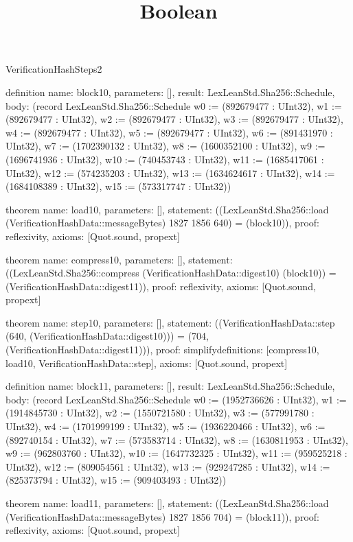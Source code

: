 \begin{lexlean}{VerificationHashSteps2}
\title{Boolean}
\begin{semanticmodule}

definition{
  name: block10,
  parameters: [],
  result: LexLeanStd.Sha256::Schedule,
  body: (record LexLeanStd.Sha256::Schedule {w0 := (892679477 : UInt32), w1 := (892679477 : UInt32), w2 := (892679477 : UInt32), w3 := (892679477 : UInt32), w4 := (892679477 : UInt32), w5 := (892679477 : UInt32), w6 := (891431970 : UInt32), w7 := (1702390132 : UInt32), w8 := (1600352100 : UInt32), w9 := (1696741936 : UInt32), w10 := (740453743 : UInt32), w11 := (1685417061 : UInt32), w12 := (574235203 : UInt32), w13 := (1634624617 : UInt32), w14 := (1684108389 : UInt32), w15 := (573317747 : UInt32)})
}

theorem{
  name: load10,
  parameters: [],
  statement: ((LexLeanStd.Sha256::load (VerificationHashData::messageBytes) 1827 1856 640) = (block10)),
  proof: reflexivity{},
  axioms: [Quot.sound, propext]
}

theorem{
  name: compress10,
  parameters: [],
  statement: ((LexLeanStd.Sha256::compress (VerificationHashData::digest10) (block10)) = (VerificationHashData::digest11)),
  proof: reflexivity{},
  axioms: [Quot.sound, propext]
}

theorem{
  name: step10,
  parameters: [],
  statement: ((VerificationHashData::step (640, (VerificationHashData::digest10))) = (704, (VerificationHashData::digest11))),
  proof: simplify{definitions: [compress10, load10, VerificationHashData::step]},
  axioms: [Quot.sound, propext]
}

definition{
  name: block11,
  parameters: [],
  result: LexLeanStd.Sha256::Schedule,
  body: (record LexLeanStd.Sha256::Schedule {w0 := (1952736626 : UInt32), w1 := (1914845730 : UInt32), w2 := (1550721580 : UInt32), w3 := (577991780 : UInt32), w4 := (1701999199 : UInt32), w5 := (1936220466 : UInt32), w6 := (892740154 : UInt32), w7 := (573583714 : UInt32), w8 := (1630811953 : UInt32), w9 := (962803760 : UInt32), w10 := (1647732325 : UInt32), w11 := (959525218 : UInt32), w12 := (809054561 : UInt32), w13 := (929247285 : UInt32), w14 := (825373794 : UInt32), w15 := (909403493 : UInt32)})
}

theorem{
  name: load11,
  parameters: [],
  statement: ((LexLeanStd.Sha256::load (VerificationHashData::messageBytes) 1827 1856 704) = (block11)),
  proof: reflexivity{},
  axioms: [Quot.sound, propext]
}


\end{semanticmodule}
\end{lexlean}

